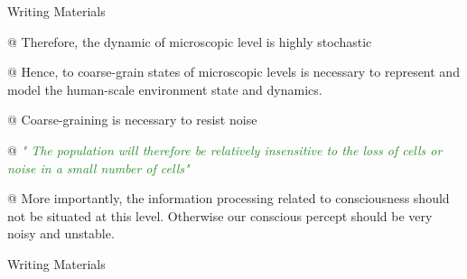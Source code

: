 \documentclass[utf8]{article}
\newenvironment{writingMaterials}
			{	
			\begin{tcolorbox}[size=small, colframe=black!20!white, toprule=1mm]
				Writing Materials
			\end{tcolorbox}
			
			\begin{easylist}[itemize]		
			}
			{
			\end{easylist}
			\begin{tcolorbox}[size=small, bottomrule=1mm, halign=flush right, colframe=black!20!white]
				Writing Materials
			\end{tcolorbox}			
			}
\newcommand{\rewrite}[1]{\textcolor{ForestGreen}{\textit{"#1"}}\newline}
\begin{document}
\begin{writingMaterials}
			@ Therefore, the dynamic of microscopic level is highly stochastic 
			
			
			@ Hence, to coarse-grain states of microscopic levels is necessary to represent and model the human-scale environment state and dynamics. 
			
			@ Coarse-graining is necessary to resist noise
			
			@ \rewrite{ The population will therefore be relatively insensitive to the loss of
				cells or noise in a small number of cells} \cite{eurich2000multidimensional}
						
			
			@ More importantly, the information processing related to consciousness should not be situated at this level. Otherwise our conscious percept should be very noisy and unstable.
								
			
		\end{writingMaterials}
	
	
\end{document}
